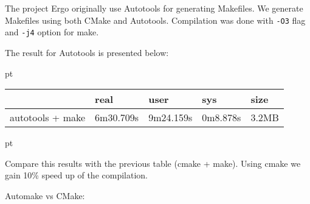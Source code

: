 \documentclass[a4paper,10pt]{article}
\begin{document}
The project Ergo originally use Autotools for generating Makefiles. We generate Makefiles using both CMake and Autotools. Compilation was done with \texttt{-O3} flag and \texttt{-j4} option for make.

The result for Autotools is presented below:

 pt

\begin{tabular}{|l|l|l|l|l|}
	\hline
	& real & user & sys & size\\
	\hline
	autotools + make & 6m30.709s & 9m24.159s & 0m8.878s & 3.2MB\\
	\hline
\end{tabular}

 pt

Compare this results with the previous table (cmake + make). Using cmake we gain 10\% speed up of the compilation.

\newpage


Automake vs CMake:
\end{document}
